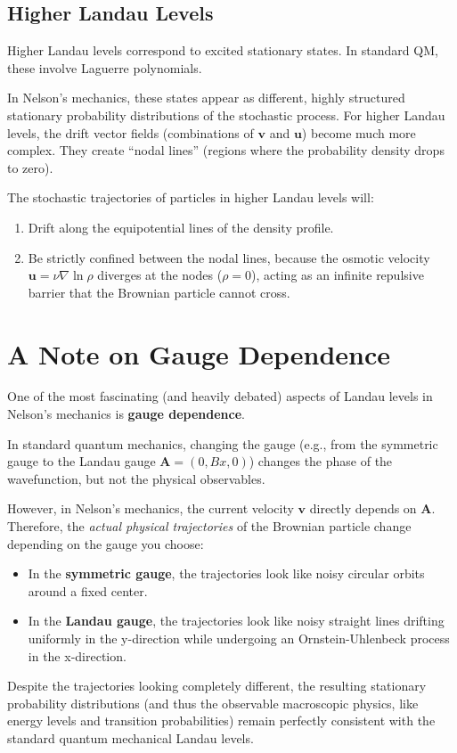 \documentclass[12pt]{article}
\begin{document}
\subsection{Higher Landau Levels}
Higher Landau levels correspond to excited stationary states. In standard QM, these involve Laguerre polynomials. 

In Nelson's mechanics, these states appear as different, highly structured stationary probability distributions of the stochastic process. For higher Landau levels, the drift vector fields (combinations of $\mathbf{v}$ and $\mathbf{u}$) become much more complex. They create ``nodal lines'' (regions where the probability density drops to zero). 

The stochastic trajectories of particles in higher Landau levels will:
\begin{enumerate}
    \item Drift along the equipotential lines of the density profile.
    \item Be strictly confined between the nodal lines, because the osmotic velocity $\mathbf{u} = \nu \nabla \ln \rho$ diverges at the nodes ($\rho = 0$), acting as an infinite repulsive barrier that the Brownian particle cannot cross.
\end{enumerate}

\section{A Note on Gauge Dependence}
One of the most fascinating (and heavily debated) aspects of Landau levels in Nelson's mechanics is \textbf{gauge dependence}. 

In standard quantum mechanics, changing the gauge (e.g., from the symmetric gauge to the Landau gauge $\mathbf{A} = (0, Bx, 0)$) changes the phase of the wavefunction, but not the physical observables. 

However, in Nelson's mechanics, the current velocity $\mathbf{v}$ directly depends on $\mathbf{A}$. Therefore, the \emph{actual physical trajectories} of the Brownian particle change depending on the gauge you choose:
\begin{itemize}
    \item In the \textbf{symmetric gauge}, the trajectories look like noisy circular orbits around a fixed center.
    \item In the \textbf{Landau gauge}, the trajectories look like noisy straight lines drifting uniformly in the y-direction while undergoing an Ornstein-Uhlenbeck process in the x-direction.
\end{itemize}

Despite the trajectories looking completely different, the resulting stationary probability distributions (and thus the observable macroscopic physics, like energy levels and transition probabilities) remain perfectly consistent with the standard quantum mechanical Landau levels.
\end{document}
